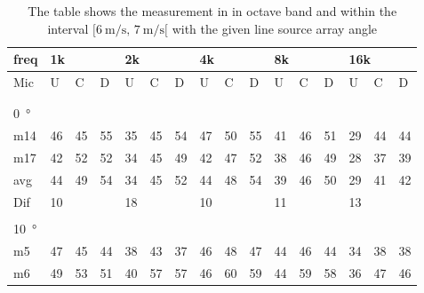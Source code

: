 \begin{table}[H]
\centering
\caption{The table shows the measurement in in octave band and within the interval $[\SI{6}{\meter\per\second},\, \SI{7}{\meter\per\second}[ $ with the given line source array angle}
\begin{tabular}{l|l|l|l|l|l|l|l|l|l|l|l|l|lll}
freq & \multicolumn{3}{l|}{1k} & \multicolumn{3}{l|}{2k} & \multicolumn{3}{l|}{4k} & \multicolumn{3}{l|}{8k} & \multicolumn{3}{l}{16k}                                \\ \hline
Mic  & U      & C      & D     & U      & C      & D     & U      & C      & D     & U      & C      & D     & \multicolumn{1}{l|}{U}  & \multicolumn{1}{l|}{C}  & D  \\ \hline
 & \multicolumn{3}{l|}{} & \multicolumn{3}{l|}{} & \multicolumn{3}{l|}{} & \multicolumn{3}{l|}{} & \multicolumn{3}{l}{}                                \\ 
 \multicolumn{16}{l}{ } \\   
\SI{0}{\degree}   & \multicolumn{3}{l|}{} & \multicolumn{3}{l|}{} & \multicolumn{3}{l|}{} & \multicolumn{3}{l|}{} & \multicolumn{3}{l}{}   \\  \hline
m14  & 46     & 45     & 55    & 35     & 45     & 54    & 47     & 50     & 55    & 41     & 46     & 51    & \multicolumn{1}{l|}{29} & \multicolumn{1}{l|}{44} & 44 \\
m17  & 42     & 52     & 52    & 34     & 45     & 49    & 42     & 47     & 52    & 38     & 46     & 49    & \multicolumn{1}{l|}{28} & \multicolumn{1}{l|}{37} & 39 \\ \hline
avg  &   44    &   49   & 54    &  34    &  45    &  52  &   44     &  48   &   54  &  39    & 46    &  50     & \multicolumn{1}{l|}{29}   & \multicolumn{1}{l|}{41}   & 42 \\ \hline  
Dif & \multicolumn{3}{l|}{10} & \multicolumn{3}{l|}{18} & \multicolumn{3}{l|}{10} & \multicolumn{3}{l|}{11} & \multicolumn{3}{l}{13}  \\ 
 \multicolumn{16}{l}{ } \\                             
\SI{10}{\degree}   & \multicolumn{3}{l|}{} & \multicolumn{3}{l|}{} & \multicolumn{3}{l|}{} & \multicolumn{3}{l|}{} & \multicolumn{3}{l}{}   \\  \hline
m5    & 47     & 45     & 44     &  38    & 43     &  37    &  46    & 48      &  47    &    44   &  46    &  44    & \multicolumn{1}{l|}{34} & \multicolumn{1}{l|}{38} & 38 \\ 
m6    & 49     &  53    &  51    &  40    &  57    &  57    & 46     &  60     &   59   &    44   &    59  &   58   & \multicolumn{1}{l|}{36} & \multicolumn{1}{l|}{47} &46  \\ 

\end{tabular}
\end{table}
